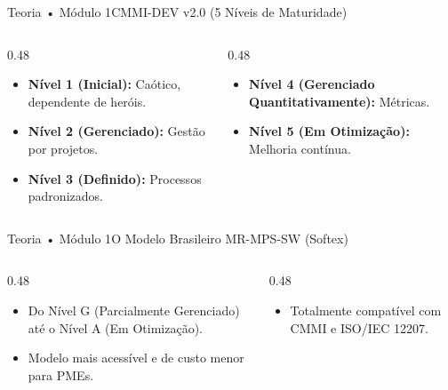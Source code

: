 \begin{senaiframe}{Teoria • Módulo 1}{CMMI-DEV v2.0 (5 Níveis de Maturidade)}
  \begin{columns}[t]
    \begin{column}{0.48\textwidth}
      \begin{tcolorbox}[senairedcard, title={Níveis Inicial a Definido}]
        \begin{itemize}
          \item \textbf{Nível 1 (Inicial):} Caótico, dependente de heróis.
          \item \textbf{Nível 2 (Gerenciado):} Gestão por projetos.
          \item \textbf{Nível 3 (Definido):} Processos padronizados.
        \end{itemize}
      \end{tcolorbox}
    \end{column}
    \begin{column}{0.48\textwidth}
      \begin{tcolorbox}[senaigreencard, title={Níveis Avançados}]
        \begin{itemize}
          \item \textbf{Nível 4 (Gerenciado Quantitativamente):} Métricas.
          \item \textbf{Nível 5 (Em Otimização):} Melhoria contínua.
        \end{itemize}
      \end{tcolorbox}
    \end{column}
  \end{columns}
\end{senaiframe}

\begin{senaiframe}{Teoria • Módulo 1}{O Modelo Brasileiro MR-MPS-SW (Softex)}
  \begin{columns}[t]
    \begin{column}{0.48\textwidth}
      \begin{tcolorbox}[senaiambercard, title={Sete Níveis de Maturidade}]
        \begin{itemize}
          \item Do Nível G (Parcialmente Gerenciado) até o Nível A (Em Otimização).
          \item Modelo mais acessível e de custo menor para PMEs.
        \end{itemize}
      \end{tcolorbox}
    \end{column}
    \begin{column}{0.48\textwidth}
      \begin{tcolorbox}[senaibluecard, title={Reconhecimento}]
        \begin{itemize}
          \item Totalmente compatível com CMMI e ISO/IEC 12207.
        \end{itemize}
      \end{tcolorbox}
    \end{column}
  \end{columns}
\end{senaiframe}

